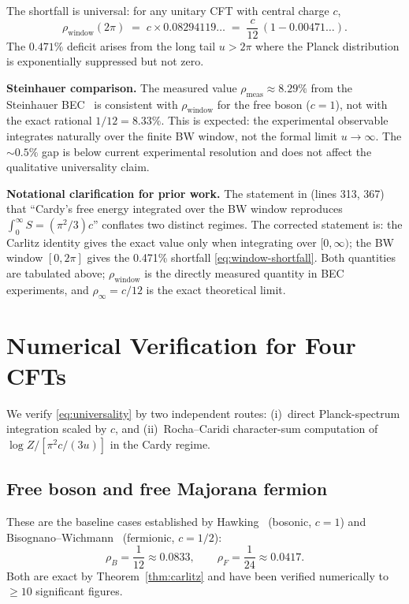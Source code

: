 \documentclass[12pt]{article}
\begin{document}
The shortfall is universal: for any unitary CFT with central charge $c$,
\begin{equation}
  \rho_{\mathrm{window}}(2\pi)
  \;=\; c\times 0.08294119\ldots
  \;=\; \frac{c}{12}\,(1 - 0.00471\ldots).
\label{eq:window-shortfall}
\end{equation}
The $0.471\%$ deficit arises from the long tail $u > 2\pi$ where the
Planck distribution is exponentially suppressed but not zero.

\medskip
\noindent\textbf{Steinhauer comparison.}  The measured value
$\rho_{\mathrm{meas}}\approx 8.29\%$ from the Steinhauer
BEC~\cite{Steinhauer2019} is consistent with $\rho_{\mathrm{window}}$
for the free boson ($c=1$), not with the exact rational $1/12 = 8.33\%$.
This is expected: the experimental observable integrates naturally over
the finite BW window, not the formal limit $u\to\infty$.  The
$\sim 0.5\%$ gap is below current experimental resolution and does not
affect the qualitative universality claim.

\medskip
\noindent\textbf{Notational clarification for prior work.}  The
statement in \cite{ECI_v6} (lines 313, 367) that ``Cardy's free energy
integrated over the BW window reproduces $\int_0^\infty S = (\pi^2/3)c$''
conflates two distinct regimes.  The corrected statement is: the Carlitz
identity gives the exact value only when integrating over
$[0,\infty)$; the BW window $[0,2\pi]$ gives the 0.471\% shortfall
\eqref{eq:window-shortfall}.  Both quantities are tabulated above;
$\rho_{\mathrm{window}}$ is the directly measured quantity in BEC
experiments, and $\rho_\infty = c/12$ is the exact theoretical limit.

\section{Numerical Verification for Four CFTs}

We verify \eqref{eq:universality} by two independent routes:
(i)~direct Planck-spectrum integration scaled by $c$, and
(ii)~Rocha--Caridi character-sum computation of
$\log Z/[\pi^2 c/(3u)]$ in the Cardy regime.

\subsection{Free boson and free Majorana fermion}

These are the baseline cases established by Hawking~\cite{Hawking1975}
(bosonic, $c=1$) and Bisognano--Wichmann~\cite{BisognanoWichmann1976}
(fermionic, $c=1/2$):
\[
  \rho_B = \frac{1}{12} \approx 0.0833,
  \qquad
  \rho_F = \frac{1}{24} \approx 0.0417.
\]
Both are exact by Theorem~\ref{thm:carlitz} and have been verified
numerically to $\geq 10$ significant figures.
\end{document}
